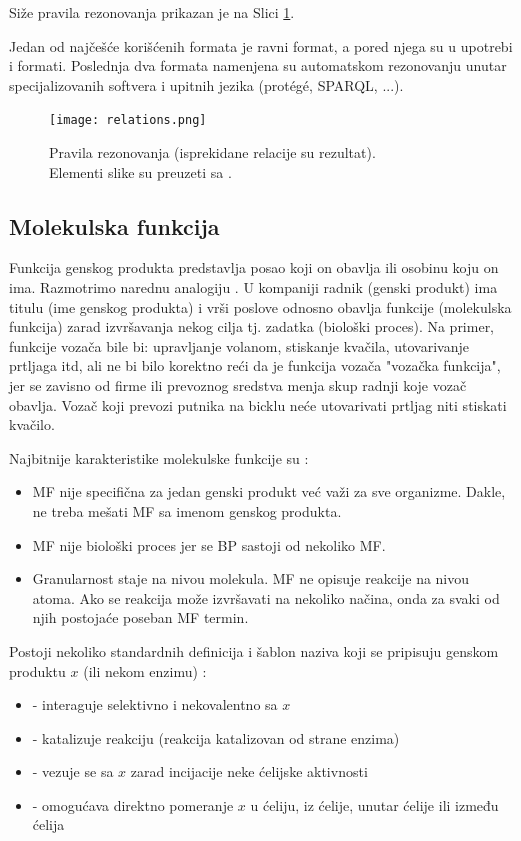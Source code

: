 Siže pravila rezonovanja prikazan je na Slici \ref{fig:relations}.

Jedan od najčešće korišćenih formata je  ravni  format, a pored njega
su u upotrebi  i  formati.  Poslednja dva formata
namenjena su automatskom rezonovanju unutar specijalizovanih softvera i upitnih
jezika (protégé, SPARQL, ...).

\begin{figure}[h!]
  \centering
  \texttt{[image: relations.png]}
  \caption{Pravila rezonovanja (isprekidane relacije su rezultat). \\ Elementi slike su preuzeti sa \parencite{go_veb}.}
  \label{fig:relations}
\end{figure}


\subsection{Molekulska funkcija}
\label{MF}

Funkcija genskog produkta predstavlja posao koji on obavlja ili osobinu koju on ima.
Razmotrimo narednu analogiju \parencite{go_mf}.  U kompaniji radnik (genski produkt) ima titulu
(ime genskog produkta) i vrši poslove odnosno obavlja funkcije (molekulska
funkcija) zarad izvršavanja nekog cilja tj. zadatka (biološki proces). Na
primer, funkcije vozača bile bi: upravljanje volanom, stiskanje kvačila,
utovarivanje prtljaga itd, ali ne bi bilo korektno reći da je funkcija vozača
"vozačka funkcija", jer se zavisno od firme ili prevoznog sredstva menja skup
radnji koje vozač obavlja.  Vozač koji prevozi putnika na bicklu neće
utovarivati prtljag niti stiskati kvačilo.

Najbitnije karakteristike molekulske funkcije su \parencite{go_mf}:
\begin{itemize}
  \item MF nije specifična za jedan genski produkt već važi za sve organizme. Dakle, ne treba mešati MF sa imenom genskog produkta.
  \item MF nije biološki proces jer se BP sastoji od nekoliko MF.
  \item Granularnost staje na nivou molekula. MF ne opisuje reakcije na nivou
    atoma. Ako se reakcija može izvršavati na nekoliko načina, onda za svaki od njih
    postojaće poseban MF termin.
\end{itemize}

Postoji nekoliko standardnih definicija i šablon naziva koji se pripisuju genskom
produktu $x$ (ili nekom enzimu) \parencite{go_mf}:
\begin{itemize}
  \item {} - interaguje selektivno i nekovalentno sa $x$
  \item {} - katalizuje reakciju (reakcija katalizovan od strane enzima)
  \item {} - vezuje se sa $x$ zarad incijacije neke ćelijske aktivnosti
  \item {} - omogućava direktno pomeranje $x$ u ćeliju, iz ćelije, unutar ćelije ili između ćelija
\end{itemize}

